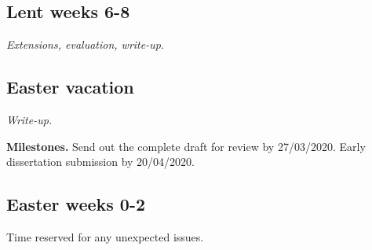 \documentclass[12pt,a4paper,twoside]{article}
\begin{document}
\subsection*{Lent weeks 6-8}
\textit{Extensions, evaluation, write-up.}

\subsection*{Easter vacation}
\textit{Write-up.}

\textbf{Milestones.} Send out the complete draft for review by 27/03/2020. Early dissertation submission by 20/04/2020.

\subsection*{Easter weeks 0-2}
 Time reserved for any unexpected issues.



\end{document}
